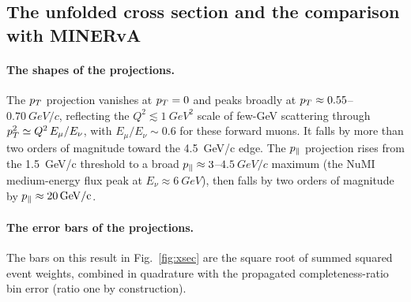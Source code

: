 \subsection{The unfolded cross section and the comparison with MINERvA}\label{recsec:twod-result}


\paragraph{The shapes of the projections.} The $p_{T}$ projection vanishes at $p_{T}=0$ and peaks broadly at $p_{T}\approx0.55$--$\SI{0.70}{GeV/c}$, reflecting the $Q^{2}\lesssim\SI{1}{GeV^2}$ scale of few-GeV scattering through $p_{T}^{2}\simeq Q^{2}\,E_\mu/E_\nu$, with $E_\mu/E_\nu\sim0.6$ for these forward muons. It falls by more than two orders of magnitude toward the \SI{4.5}{GeV/c} edge. The $p_{\parallel}$ projection rises from the \SI{1.5}{GeV/c} threshold to a broad $p_{\parallel}\approx3$--$\SI{4.5}{GeV/c}$ maximum (the NuMI medium-energy flux peak at $E_\nu\approx\SI{6}{GeV}$), then falls by two orders of magnitude by $p_{\parallel}\approx\SI{20}{GeV/c}$.

\paragraph{The error bars of the projections.} The bars on this result in Fig.~\ref{fig:xsec} are the square root of summed squared event weights, combined in quadrature with the propagated completeness-ratio bin error (ratio one by construction).

